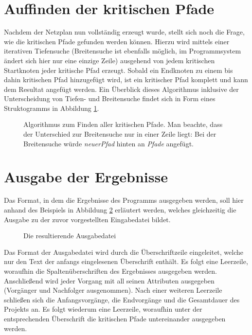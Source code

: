 \section{Auffinden der kritischen Pfade}

Nachdem der Netzplan nun vollst\"andig erzeugt wurde, stellt sich noch
die Frage, wie die kritischen Pfade gefunden werden k\"onnen. Hierzu
wird mittels einer iterativen Tiefensuche (Breitensuche ist ebenfalls
m\"oglich, im
Programmsystem \"andert sich hier nur eine einzige Zeile) ausgehend
von jedem kritischen Startknoten
jeder kritische Pfad erzeugt. Sobald ein Endknoten zu einem bis dahin
kritischen Pfad hinzugef\"ugt wird, ist ein kritischer Pfad
komplett und kann dem Resultat angef\"ugt werden. Ein \"Uberblick
dieses Algorithmus inklusive der Unterscheidung von Tiefen- und
Breitensuche findet sich in Form eines Struktogramms in
Abbildung \ref{pfadefinden}.

\begin{figure}
  
  \caption{Algorithmus zum Finden aller kritischen Pfade. Man beachte,
  dass der Unterschied zur Breitensuche nur in einer Zeile liegt: Bei
  der Breitensuche w\"urde \textit{neuerPfad} hinten an \textit{Pfade}
  angef\"ugt.}
  \label{pfadefinden}
\end{figure}

\section{Ausgabe der Ergebnisse}

Das Format, in dem die Ergebnisse des Programms ausgegeben werden, soll
hier anhand des Beispiels in Abbildung \ref{abb:ausgabedatei}
erl\"autert werden, welches
gleichzeitig die Ausgabe zu der zuvor vorgestellten Eingabedatei bildet.

\begin{figure}
  \resizebox{\textwidth}{!}{
    \fbox{
      \setlength{\fboxrule}{1pt}
      
    }
  }
  \caption{Die resultierende Ausgabedatei}
  \label{abb:ausgabedatei}
\end{figure}

Das Format der Ausgabedatei wird durch die \"Uberschriftzeile
eingeleitet, welche nur den Text der anfangs eingelesenen
\"Uberschrift enth\"alt. Es folgt eine Leerzeile, woraufhin die
Spalten\"uberschriften des Ergebnisses ausgegeben
werden. Anschlie{\ss}end wird jeder Vorgang mit all seinen
Attributen ausgegeben (Vorg\"anger und Nachfolger ausgenommen).
Nach einer weiteren Leerzeile schlie{\ss}en sich die
Anfangsvorg\"ange, die Endvorg\"ange und die Gesamtdauer des Projekts
an. Es folgt wiederum eine
Leerzeile, woraufhin unter der entsprechenden \"Uberschrift die
kritischen Pfade untereinander ausgegeben werden.
